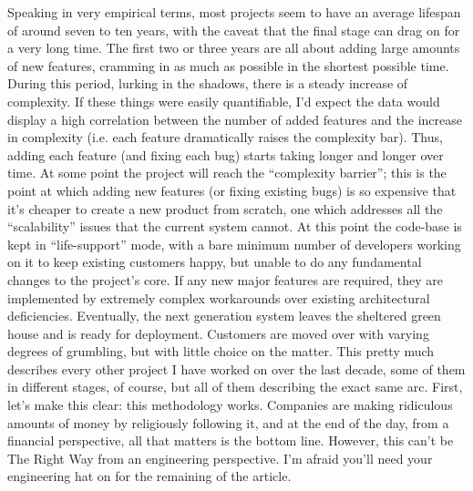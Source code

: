 \documentclass{memoir}
\begin{document}
Speaking in very empirical terms, most projects seem to have an
average lifespan of around seven to ten years, with the caveat that
the final stage can drag on for a very long time. The first two or
three years are all about adding large amounts of new features,
cramming in as much as possible in the shortest possible time. During
this period, lurking in the shadows, there is a steady increase of
complexity. If these things were easily quantifiable, I'd expect the
data would display a high correlation between the number of added
features and the increase in complexity (i.e. each feature
dramatically raises the complexity bar). Thus, adding each feature
(and fixing each bug) starts taking longer and longer over time. At
some point the project will reach the ``complexity barrier''; this is
the point at which adding new features (or fixing existing bugs) is so
expensive that it's cheaper to create a new product from scratch, one
which addresses all the ``scalability'' issues that the current system
cannot. At this point the code-base is kept in ``life-support'' mode,
with a bare minimum number of developers working on it to keep
existing customers happy, but unable to do any fundamental changes to
the project's core. If any new major features are required, they are
implemented by extremely complex workarounds over existing
architectural deficiencies. Eventually, the next generation system
leaves the sheltered green house and is ready for
deployment. Customers are moved over with varying degrees of
grumbling, but with little choice on the matter. This pretty much
describes every other project I have worked on over the last decade,
some of them in different stages, of course, but all of them
describing the exact same arc. First, let's make this clear: this
methodology works. Companies are making ridiculous amounts of money by
religiously following it, and at the end of the day, from a financial
perspective, all that matters is the bottom line. However, this can't
be The Right Way from an engineering perspective. I'm afraid you'll
need your engineering hat on for the remaining of the article.
\end{document}
